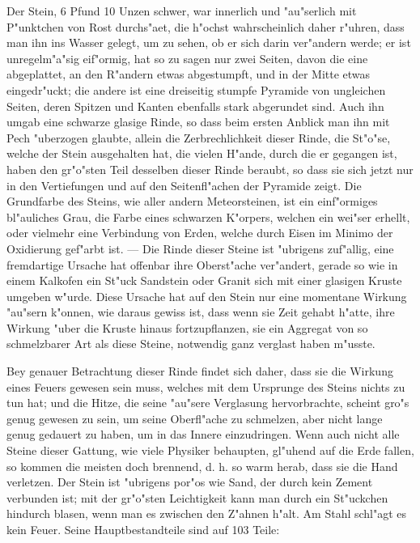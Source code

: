 \documentclass[a4paper, 11pt, oneside, polutonikogreek, german]{article}
\begin{document}
Der Stein, 6 Pfund 10 Unzen schwer, war innerlich und "au"serlich mit P"unktchen von Rost durchs"aet, die h"ochst wahrscheinlich daher r"uhren, dass man ihn ins Wasser gelegt, um zu sehen, ob er sich darin ver"andern werde; er ist unregelm"a"sig eif"ormig, hat so zu sagen nur zwei Seiten, davon die eine abgeplattet, an den R"andern etwas abgestumpft, und in der Mitte etwas eingedr"uckt; die andere ist eine dreiseitig stumpfe Pyramide von ungleichen Seiten, deren Spitzen und Kanten ebenfalls stark abgerundet sind. Auch ihn umgab eine schwarze glasige Rinde, so dass beim ersten Anblick man ihn mit Pech "uberzogen glaubte, allein die Zerbrechlichkeit dieser Rinde, die St"o"se, welche der Stein ausgehalten hat, die vielen H"ande, durch die er gegangen ist, haben den gr"o"sten Teil desselben dieser Rinde beraubt, so dass sie sich jetzt nur in den Vertiefungen und auf den Seitenfl"achen der Pyramide zeigt. Die Grundfarbe des Steins, wie aller andern Meteorsteinen, ist ein einf"ormiges bl"auliches Grau, die Farbe eines schwarzen K"orpers, welchen ein wei"ser erhellt, oder vielmehr eine Verbindung von Erden, welche durch Eisen im Minimo der Oxidierung gef"arbt ist. --- Die Rinde dieser Steine ist "ubrigens zuf"allig, eine fremdartige Ursache hat offenbar ihre Oberst"ache ver"andert, gerade so wie in einem Kalkofen ein St"uck Sandstein oder Granit sich mit einer glasigen Kruste umgeben w"urde. Diese Ursache hat auf den Stein nur eine momentane Wirkung "au"sern k"onnen, wie daraus gewiss ist, dass wenn sie Zeit gehabt h"atte, ihre Wirkung "uber die Kruste hinaus fortzupflanzen, sie ein Aggregat von so schmelzbarer Art als diese Steine, notwendig ganz verglast haben m"usste.

Bey genauer Betrachtung dieser Rinde findet sich daher, dass sie die Wirkung eines Feuers gewesen sein muss, welches mit dem Ursprunge des Steins nichts zu tun hat; und die Hitze, die seine "au"sere Verglasung hervorbrachte, scheint gro"s genug gewesen zu sein, um seine Oberfl"ache zu schmelzen, aber nicht lange genug gedauert zu haben, um in das Innere einzudringen. Wenn auch nicht alle Steine dieser Gattung, wie viele Physiker behaupten, gl"uhend auf die Erde fallen, so kommen die meisten doch brennend, d. h. so warm herab, dass sie die Hand verletzen. Der Stein ist "ubrigens por"os wie Sand, der durch kein Zement verbunden ist; mit der gr"o"sten Leichtigkeit kann man durch ein St"uckchen hindurch blasen, wenn man es zwischen den Z"ahnen h"alt. Am Stahl schl"agt es kein Feuer. Seine Hauptbestandteile sind auf 103 Teile:
\end{document}
